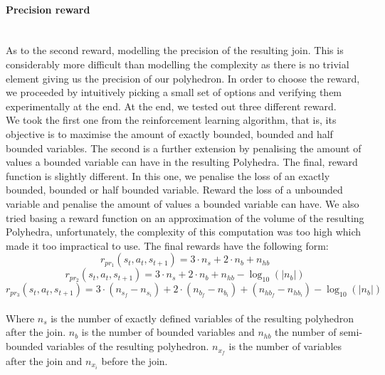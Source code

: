 \paragraph{Precision reward}\mbox{}\\
As to the second reward, modelling the precision of the resulting join. This is considerably more difficult than modelling the complexity as there is no trivial element giving us the precision of our polyhedron. In order to choose the reward, we proceeded by intuitively picking a small set of options and verifying them experimentally at the end. At the end, we tested out three different reward.\\
We took the first one from the reinforcement learning algorithm, that is, its objective is to maximise the amount of exactly bounded, bounded and half bounded variables. The second is a further extension by penalising the amount of values a bounded variable can have in the resulting Polyhedra. The final, reward function is slightly different. In this one, we penalise the loss of an exactly bounded, bounded or half bounded variable. Reward the loss of a unbounded variable and penalise the amount of values a bounded variable can have. We also tried basing a reward function on an approximation of the volume of the resulting Polyhedra, unfortunately, the complexity of this computation was too high which made it too impractical to use. The final rewards have the following form:
\begin{equation}
		r_{pr_1}(s_t,a_t,s_{t+1}) = 3  \cdot n_s + 2 \cdot n_b + n_{hb}
\end{equation}
\begin{equation}
		r_{pr_2}(s_t,a_t,s_{t+1}) = 3  \cdot n_s + 2 \cdot n_b + n_{hb} - \log_{10}(|n_b|)
\end{equation}
\begin{equation}
		r_{pr_3}(s_t,a_t,s_{t+1}) = 3  \cdot (n_{s_f} - n_{s_i}) + 2 \cdot (n_{b_f} - n_{b_i}) + (n_{hb_f} - n_{hb_i}) - \log_{10}(|n_b|)
\end{equation}\mbox{}\\
Where $n_s$ is the number of exactly defined variables of the resulting polyhedron after the join. $n_b$ is the number of bounded variables and $n_{hb}$ the number of semi-bounded variables of the resulting polyhedron. $n_{x_f}$ is the number of variables after the join and $n_{x_i}$ before the join.
